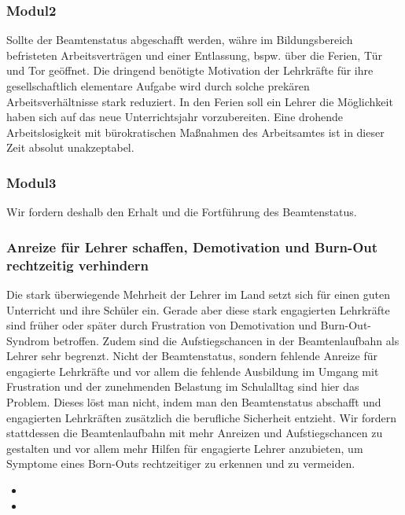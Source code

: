 \subsubsection{Modul2}
\abstimmung
Sollte der Beamtenstatus abgeschafft werden, währe im Bildungsbereich befristeten Arbeitsverträgen und einer Entlassung, bspw. über die Ferien, Tür und Tor geöffnet. Die dringend benötigte Motivation der Lehrkräfte für ihre gesellschaftlich elementare Aufgabe wird durch solche prekären Arbeitsverhältnisse stark reduziert. In den Ferien soll ein Lehrer die Möglichkeit haben sich auf das neue Unterrichtsjahr vorzubereiten. Eine drohende Arbeitslosigkeit mit bürokratischen Maßnahmen des Arbeitsamtes ist in dieser Zeit absolut unakzeptabel.

\subsubsection{Modul3}
\abstimmung
Wir fordern deshalb den Erhalt und die Fortführung des Beamtenstatus.


\subsubsection{Anreize für Lehrer schaffen, Demotivation und Burn-Out rechtzeitig verhindern}
\abstimmung
Die stark überwiegende Mehrheit der Lehrer im Land setzt sich für einen guten Unterricht und ihre Schüler ein. Gerade aber diese stark engagierten Lehrkräfte sind früher oder später durch Frustration von Demotivation und Burn-Out-Syndrom betroffen. Zudem sind die Aufstiegschancen in der Beamtenlaufbahn als Lehrer sehr begrenzt. Nicht der Beamtenstatus, sondern fehlende Anreize für engagierte Lehrkräfte und vor allem die fehlende Ausbildung im Umgang mit Frustration und der zunehmenden Belastung im Schulalltag sind hier das Problem. Dieses löst man nicht, indem man den Beamtenstatus abschafft und engagierten Lehrkräften zusätzlich die berufliche Sicherheit entzieht. Wir fordern stattdessen die Beamtenlaufbahn mit mehr Anreizen und Aufstiegschancen zu gestalten und vor allem mehr Hilfen für engagierte Lehrer anzubieten, um Symptome eines Born-Outs rechtzeitiger zu erkennen und zu vermeiden.

\label{wp:bildung:beamten}
\begin{itemize}
\item {}
\item {}
\end{itemize} 

